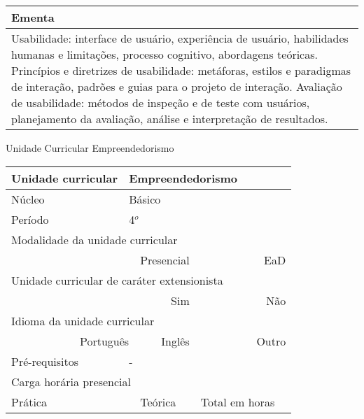 \begin{quadro}[h!]
\begin{tabular}{|p{3cm} p{2cm} p{3cm} p{2cm} p{3cm} p{2cm}|}
\multicolumn{6}{|p{15cm}|}{\cellcolor{blue1} Ementa} \\\hline
\hline\multicolumn{6}{|p{15cm}|}{\scriptsize Usabilidade: interface de usuário, experiência de usuário, habilidades humanas e limitações, processo cognitivo, abordagens teóricas.                                                                    Princípios e diretrizes de usabilidade: metáforas, estilos e paradigmas de interação, padrões e guias para o projeto de interação. Avaliação de usabilidade: métodos de inspeção e de teste com usuários, planejamento da avaliação, análise e interpretação de resultados.}\\\hline
\hline
	\end{tabular}
\end{quadro}
\begin{quadro}[h!]
  \centering\scriptsize
\caption{Unidade Curricular Empreendedorismo}
\label{ unit_22 }
\begin{tabular}{|p{3cm} p{2cm} p{3cm} p{2cm} p{3cm} p{2cm}|}\hline
\multicolumn{1}{|p{3cm}|}{\cellcolor{blue1} Unidade curricular} & \multicolumn{5}{p{9cm}|}{ Empreendedorismo }\\\hline
\multicolumn{1}{|p{3cm}|}{\cellcolor{blue1} Núcleo} & \multicolumn{5}{p{11.5cm}|}{ Básico }\\\hline
\multicolumn{1}{|p{3cm}|}{\cellcolor{blue1} Período} & \multicolumn{5}{p{9cm}|}{ 4$^o$ }\\\hline
\multicolumn{6}{|p{15cm}|}{\cellcolor{blue1} Modalidade da unidade curricular} \\\hline
\multicolumn{2}{|r}{		} &  \multicolumn{2}{r}{Presencial \XBox } & \multicolumn{2}{r|}{EaD \Square	} \\\hline
\multicolumn{6}{|p{15cm}|}{\cellcolor{blue1} Unidade curricular de caráter extensionista} \\\hline
\multicolumn{4}{|r}{			Sim \Square	} & \multicolumn{2}{r|}{	Não \XBox	}\\\hline
\multicolumn{6}{|p{15cm}|}{\cellcolor{blue1} Idioma da unidade curricular} \\ \hline
\multicolumn{2}{|r}{	Português \XBox	} &  \multicolumn{2}{r}{	Inglês \Square	} & \multicolumn{2}{r|}{	Outro \Square	} \\ \hline
\multicolumn{1}{|p{3cm}|}{\cellcolor{blue1} Pré-requisitos} & \multicolumn{5}{p{9cm}|}{ - }\\ \hline
\multicolumn{6}{|p{15cm}|}{\cellcolor{blue1} Carga horária presencial} \\ \hline
\multicolumn{1}{|p{3cm}|}{\raggedleft Prática} & \multicolumn{1}{p{1cm}|}{\centering	15	} &  \multicolumn{1}{p{3cm}|}{\raggedleft Teórica}  & \multicolumn{1}{p{1cm}|}{\centering 	15 } & \multicolumn{1}{p{3cm}|}{\raggedleft Total em horas} & \multicolumn{1}{p{1cm}|}{\raggedleft	30	} \\ \hline

\end{tabular}
\end{quadro}
